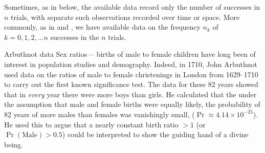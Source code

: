 \documentclass[10pt,krantz2]{krantz}\usepackage[]{graphicx}\usepackage[]{color}
\begin{document}
Sometimes, as in 
below, the available data record only the number of successes
in $n$ trials, with separate such observations recorded over
time or space.  More commonly, as in 
and ,
we have available data on the frequency $n_k$
of $k = 0, 1, 2, \dots n$ successes in the $n$ trials.


\begin{Example}[arbuthnot1]{Arbuthnot data}
Sex ratios--- births of male to female children have long been of interest
in population studies and demography. Indeed, in 1710, John Arbuthnot \citep{Arbuthnot:1710}
used data on the ratios of male to female christenings in London from 1629--1710 to carry out the first known significance test.
The data for these 82 years showed that in \emph{every} year there were more boys than girls.
He calculated that the under the assumption
that male and female births were equally likely, the probability of 82 years of
more males than females was vanishingly small,
 ($\Pr \approx 4.14 \times 10^{-25}$).
He used this to argue that a nearly constant birth ratio $> 1$ (or $\Pr(\mathrm{Male}) > 0.5$)
could be interpreted to show the guiding hand of a divine being.


\end{Example}
\end{document}

